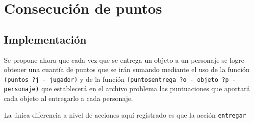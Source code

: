 \documentclass[a4paper, 11pt]{article}
\begin{document}
\section{Consecución de puntos}
	\subsection{Implementación}
		Se propone ahora que cada vez que se entrega un objeto a un personaje se logre obtener una
		cuantía de puntos que se irán sumando mediante el uso de la función \verb|(puntos ?j - jugador)|
		y de la función \verb|(puntosentrega ?o - objeto ?p - personaje)| que establecerá en el archivo
		problema las puntuaciones que aportará cada objeto al entregarlo a cada personaje.
		
		La única diferencia a nivel de acciones aquí registrado es que la acción \verb|entregar|
\end{document}
